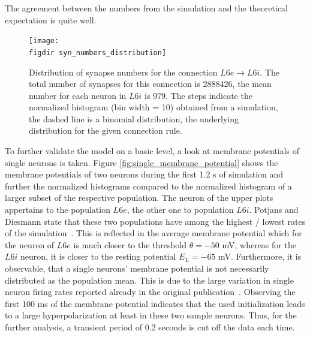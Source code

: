 The agreement between the numbers from the simulation and the theoretical expectation is quite
well. 
\begin{figure}[htpb]
    \centering
    \texttt{[image: \\figdir syn\_numbers\_distribution]}
    \caption{
        Distribution of synapse numbers for the connection $L6e \to L6i$.
        The total number of synapses for this connection is $2888426$, 
        the mean number for each neuron in $L6i$ is $979$.
        The steps indicate the normalized histogram (bin width = 10) obtained 
        from a simulation, the dashed line is a binomial distribution, the 
        underlying distribution for the given connection rule. 
    }
    \label{fig:syn_numbers_distribution}
\end{figure}

To further validate the model on a basic level, a look at membrane potentials of 
single neurons is taken. Figure \ref{fig:single_membrane_potential} shows the membrane 
potentials of two neurons during the first 1.2 s of simulation and further 
the normalized histograms compared to the normalized histogram of a larger subset of the 
respective population. The neuron of the upper plots appertains to the population
$L6e$, the other one to population $L6i$. Potjans and Diesmann state that
these two populations have among the highest / lowest rates of the simulation~\cite{potjans2014}.
This is reflected in the average membrane potential which for the neuron of $L6e$
is much closer to the threshold $\theta = -50$ mV, whereas for the $L6i$ neuron, it is
closer to the resting potential $E_L = -65$ mV. Furthermore, it is observable, that a single 
neurons' membrane potential is not necessarily distributed as the population mean. 
This is due to the large variation in single neuron firing rates reported already in the 
original publication~\cite{potjans2014}. Observing the first 100 ms of the membrane potential 
indicates that the used initialization leads to a large hyperpolarization at least in these two 
sample neurons. Thus, for the further analysis, a transient period of 0.2 seconds is cut off the
data each time. 

